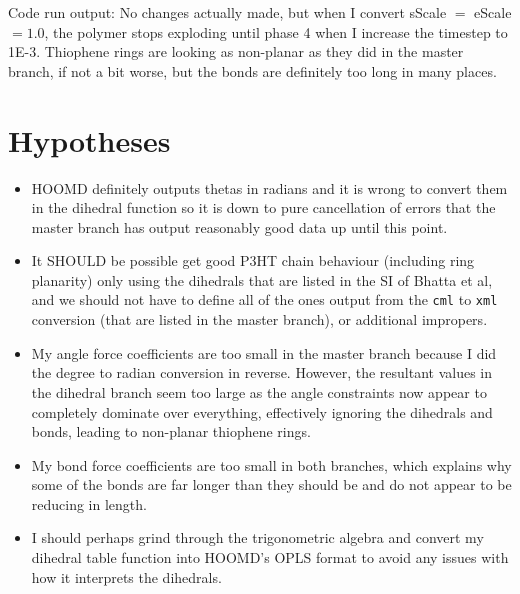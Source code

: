 \documentclass[12pt]{article}
\begin{document}
Code run output: No changes actually made, but when I convert sScale $=$ eScale $= 1.0$, the polymer stops exploding until phase 4 when I increase the timestep to 1E-3. Thiophene rings are looking as non-planar as they did in the master branch, if not a bit worse, but the bonds are definitely too long in many places.


\section{Hypotheses}
 
\begin{itemize}
\item{HOOMD definitely outputs thetas in radians and it is wrong to convert them in the dihedral function so it is down to pure cancellation of errors that the master branch has output reasonably good data up until this point.}
\item{It SHOULD be possible get good P3HT chain behaviour (including ring planarity) only using the dihedrals that are listed in the SI of Bhatta et al, and we should not have to define all of the ones output from the \verb|cml| to \verb|xml| conversion (that are listed in the master branch), or additional impropers.}
\item{My angle force coefficients are too small in the master branch because I did the degree to radian conversion in reverse. However, the resultant values in the dihedral branch seem too large as the angle constraints now appear to completely dominate over everything, effectively ignoring the dihedrals and bonds, leading to non-planar thiophene rings.}
\item{My bond force coefficients are too small in both branches, which explains why some of the bonds are far longer than they should be and do not appear to be reducing in length.}
\item{I should perhaps grind through the trigonometric algebra and convert my dihedral table function into HOOMD's OPLS format to avoid any issues with how it interprets the dihedrals.}
\end{itemize}
\end{document}
